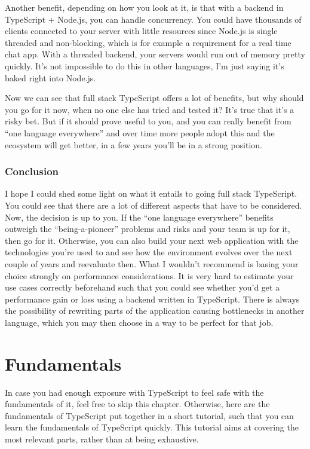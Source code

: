 \documentclass[12pt,a4paper]{report}
\begin{document}
Another benefit, depending on how you look at it, is that with a backend in TypeScript + Node.js, you can handle concurrency. You could have thousands of clients connected to your server with little resources since Node.js is single threaded and non-blocking, which is for example a requirement for a real time chat app. With a threaded backend, your servers would run out of memory pretty quickly. It's not impossible to do this in other languages, I'm just saying it's baked right into Node.js.

Now we can see that full stack TypeScript offers a lot of benefits, but why should you go for it now, when no one else has tried and tested it? It's true that it's a risky bet. But if it should prove useful to you, and you can really benefit from ``one language everywhere'' and over time more people adopt this and the ecosystem will get better, in a few years you'll be in a strong position.

\subsection{Conclusion}
I hope I could shed some light on what it entails to going full stack TypeScript. You could see that there are a lot of different aspects that have to be considered. Now, the decision is up to you. If the ``one language everywhere'' benefits outweigh the ``being-a-pioneer'' problems and risks and your team is up for it, then go for it. Otherwise, you can also build your next web application with the technologies you're used to and see how the environment evolves over the next couple of years and reevaluate then. What I wouldn't recommend is basing your choice strongly on performance considerations. It is very hard to estimate your use cases correctly beforehand such that you could see whether you'd get a performance gain or loss using a backend written in TypeScript. There is always the possibility of rewriting parts of the application causing bottlenecks in another language, which you may then choose in a way to be perfect for that job.

\chapter{Fundamentals}
\label{chapter:fundamentals}

In case you had enough exposure with TypeScript to feel safe with the fundamentals of it, feel free to skip this chapter. Otherwise, here are the fundamentals of TypeScript put together in a short tutorial, such that you can learn the fundamentals of TypeScript quickly. This tutorial aims at covering the most relevant parts, rather than at being exhaustive.
\end{document}
